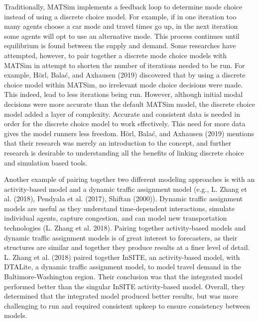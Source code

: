 \documentclass[12pt, oneside, openright]{byuthesis}
\begin{document}
Traditionally, MATSim implements a feedback loop to determine mode choice instead of using a discrete choice model. For example, if in one iteration too many agents choose a car mode and travel times go up, in the next iteration some agents will opt to use an alternative mode. This process continues until equilibrium is found between the supply and demand. Some researches have attempted, however, to pair together a discrete mode choice models with MATSim in attempt to shorten the number of iterations needed to be run. For example, Hörl, Balać, and Axhausen (2019) discovered that by using a discrete choice model within MATSim, no irrelevant mode choice decisions were made. This indeed, lead to less iterations being run. However, although initial modal decisions were more accurate than the default MATSim model, the discrete choice model added a layer of complexity. Accurate and consistent data is needed in order for the discrete choice model to work effectively. This need for more data gives the model runners less freedom. Hörl, Balać, and Axhausen (2019) mentions that their research was merely an introduction to the concept, and further research is desirable to understanding all the benefits of linking discrete choice and simulation based tools.

Another example of pairing together two different modeling approaches is with an activity-based model and a dynamic traffic assignment model (e.g., L. Zhang et al. (2018), Pendyala et al. (2017), Shiftan (2000)). Dynamic traffic assignment models are useful as they understand time-dependent interactions, simulate individual agents, capture congestion, and can model new transportation technologies (L. Zhang et al. 2018). Pairing together activity-based models and dynamic traffic assignment models is of great interest to forecasters, as their structures are similar and together they produce results at a finer level of detail. L. Zhang et al. (2018) paired together InSITE, an activity-based model, with DTALite, a dynamic traffic assignment model, to model travel demand in the Baltimore-Washington region. Their conclusion was that the integrated model performed better than the singular InSITE activity-based model. Overall, they determined that the integrated model produced better results, but was more challenging to run and required consistent upkeep to ensure consistency between models.
\end{document}
